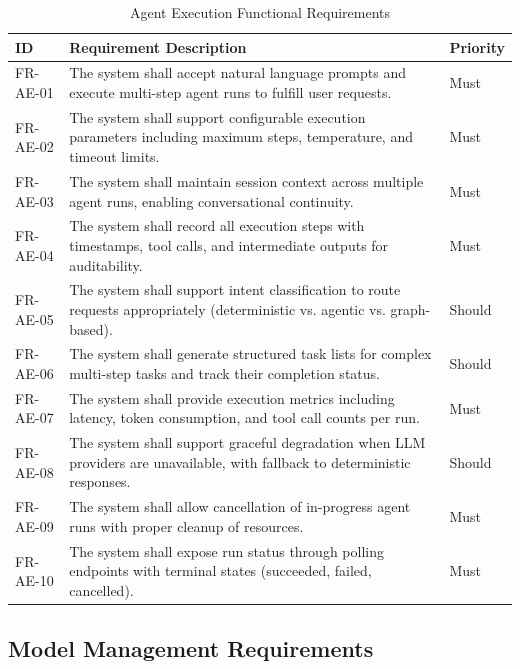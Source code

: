 \documentclass[a4paper,twoside]{sapthesis}
\begin{document}
\begin{table}[htbp]
\centering
\caption{Agent Execution Functional Requirements}
\label{tab:fr-agent-execution}
\small
\begin{tabularx}{\textwidth}{|l|X|l|}
\hline
\textbf{ID} & \textbf{Requirement Description} & \textbf{Priority} \\
\midrule
FR-AE-01 & The system shall accept natural language prompts and execute multi-step agent runs to fulfill user requests. & Must \\
\midrule
FR-AE-02 & The system shall support configurable execution parameters including maximum steps, temperature, and timeout limits. & Must \\
\midrule
FR-AE-03 & The system shall maintain session context across multiple agent runs, enabling conversational continuity. & Must \\
\midrule
FR-AE-04 & The system shall record all execution steps with timestamps, tool calls, and intermediate outputs for auditability. & Must \\
\midrule
FR-AE-05 & The system shall support intent classification to route requests appropriately (deterministic vs. agentic vs. graph-based). & Should \\
\midrule
FR-AE-06 & The system shall generate structured task lists for complex multi-step tasks and track their completion status. & Should \\
\midrule
FR-AE-07 & The system shall provide execution metrics including latency, token consumption, and tool call counts per run. & Must \\
\midrule
FR-AE-08 & The system shall support graceful degradation when LLM providers are unavailable, with fallback to deterministic responses. & Should \\
\midrule
FR-AE-09 & The system shall allow cancellation of in-progress agent runs with proper cleanup of resources. & Must \\
\midrule
FR-AE-10 & The system shall expose run status through polling endpoints with terminal states (succeeded, failed, cancelled). & Must \\
\midrule
\end{tabularx}
\end{table}

\subsection{Model Management Requirements}
\label{subsec:fr-model-management}
\end{document}
